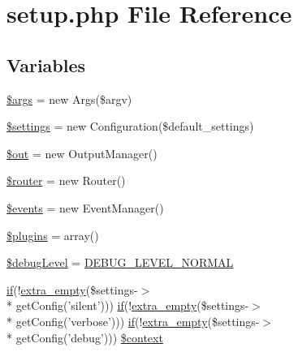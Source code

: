 \hypertarget{setup_8php}{\section{setup.\-php File Reference}
\label{setup_8php}
}
\subsection*{Variables}
\begin{DoxyCompactItemize}
\item 
\hyperlink{setup_8php_a67e94494731d99ed23b123e95175bc10}{\$args} = new Args(\$argv)
\item 
\hyperlink{setup_8php_ac7c3353107070daa85f641882931b358}{\$settings} = new Configuration(\$default\-\_\-settings)
\item 
\hyperlink{setup_8php_a48cb304902320d173a4eaa41543327b9}{\$out} = new Output\-Manager()
\item 
\hyperlink{setup_8php_ad77f00d881c7c3dc8bd1749c7174de92}{\$router} = new Router()
\item 
\hyperlink{setup_8php_a1bcec9bbd34255927faaf155bf3a940a}{\$events} = new Event\-Manager()
\item 
\hyperlink{setup_8php_a4ab51386acb82cd0a0066eac2567b2bd}{\$plugins} = array()
\item 
\hyperlink{setup_8php_a8907cc6f1fc6ed47ef25190cb8310f41}{\$debug\-Level} = \hyperlink{common_8php_a412f8ed486afa7fea7c81b35d0db39ba}{D\-E\-B\-U\-G\-\_\-\-L\-E\-V\-E\-L\-\_\-\-N\-O\-R\-M\-A\-L}
\item 
\hyperlink{common_8php_ab5cc02e0dea17e26d5401b25d28c71a5}{if}(!\hyperlink{functions_8php_a3cce2993eccf4627f7d607d62f63df60}{extra\-\_\-empty}(\$settings-\/$>$\\*
get\-Config('silent'))) \hyperlink{common_8php_ab5cc02e0dea17e26d5401b25d28c71a5}{if}(!\hyperlink{functions_8php_a3cce2993eccf4627f7d607d62f63df60}{extra\-\_\-empty}(\$settings-\/$>$\\*
get\-Config('verbose'))) \hyperlink{common_8php_ab5cc02e0dea17e26d5401b25d28c71a5}{if}(!\hyperlink{functions_8php_a3cce2993eccf4627f7d607d62f63df60}{extra\-\_\-empty}(\$settings-\/$>$\\*
get\-Config('debug'))) \hyperlink{setup_8php_ae05dedb802ada0155efdece2044fed64}{\$context}
\end{DoxyCompactItemize}


